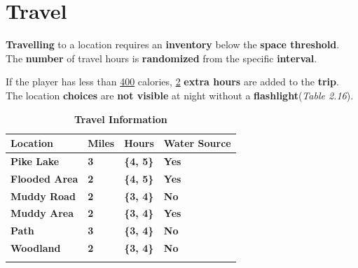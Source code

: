 	\section{Travel}
		\par \textbf{Travelling} to a location requires an \textbf{inventory} below the \textbf{space threshold}. The \textbf{number} of travel hours is \textbf{randomized} from the specific \textbf{interval}. 
		\par If the player has less than \underline{400} calories, \underline{2} \textbf{extra hours} are added to the \textbf{trip}. The location \textbf{choices} are \textbf{not visible} at night without a \textbf{flashlight}(\textit{Table 2.16}).
		\begin{longtable}{|C{10.555em}|C{5.22em}|C{5.22em}|C{6.445em}|}
		    \toprule			    
		     \textcolor[rgb]{ 1,  1,  1}{\textbf{Location}} & \textcolor[rgb]{ 1,  1,  1}{\textbf{Miles}} & \textcolor[rgb]{ 1,  1,  1}{\textbf{Hours}} & \textcolor[rgb]{ 1,  1,  1}{\textbf{Water Source}} \\
		    \midrule
		     \textbf{Pike Lake} & \textbf{3} & \textbf{\{4, 5\}} & \textbf{Yes} \\
		    \midrule
		     \textbf{Flooded Area} & \textbf{2} & \textbf{\{4, 5\}} & \textbf{Yes} \\
		    \midrule
		     \textbf{Muddy Road} & \textbf{2} & \textbf{\{3, 4\}} & \textbf{No} \\
		    \midrule
		     \textbf{Muddy Area} & \textbf{2} & \textbf{\{3, 4\}} & \textbf{Yes} \\
		    \midrule
		     \textbf{Path} & \textbf{3} & \textbf{\{3, 4\}} & \textbf{No} \\
		    \midrule
		     \textbf{Woodland} & \textbf{2} & \textbf{\{3, 4\}} & \textbf{No} \\
		    \bottomrule
		\caption{\textbf{Travel Information} }	
		\end{longtable}


\newpage